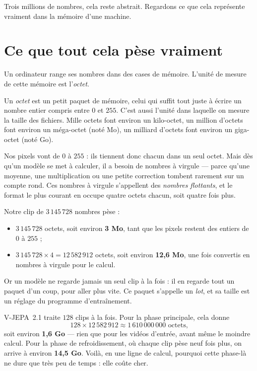Trois millions de nombres, cela reste abstrait. Regardons ce que cela
représente vraiment dans la mémoire d'une machine.

\section{Ce que tout cela pèse vraiment}

Un ordinateur range ses nombres dans des cases de mémoire. L'unité de
mesure de cette mémoire est l'\emph{octet}.

\begin{definition}[L'octet][octet]
Un \emph{octet} est un petit paquet de mémoire, celui qui suffit tout juste
à écrire un nombre entier compris entre $0$ et $255$. C'est aussi l'unité
dans laquelle on mesure la taille des fichiers. Mille octets font environ un
kilo-octet, un million d'octets font environ un méga-octet (noté Mo), un
milliard d'octets font environ un giga-octet (noté Go).
\end{definition}

Nos pixels vont de $0$ à $255$ : ils tiennent donc chacun dans un seul
octet. Mais dès qu'un modèle se met à calculer, il a besoin de nombres à
virgule — parce qu'une moyenne, une multiplication ou une petite correction
tombent rarement sur un compte rond. Ces nombres à virgule s'appellent des
\emph{nombres flottants}, et le format le plus courant en occupe quatre
octets chacun, soit quatre fois plus.

\begin{exemple}
Notre clip de $3\,145\,728$ nombres pèse :

\begin{itemize}
  \item $3\,145\,728$ octets, soit environ \textbf{3 Mo}, tant que les
        pixels restent des entiers de $0$ à $255$ ;
  \item $3\,145\,728 \times 4 = 12\,582\,912$ octets, soit environ
        \textbf{12,6 Mo}, une fois convertis en nombres à virgule pour le
        calcul.
\end{itemize}
\end{exemple}

Or un modèle ne regarde jamais un seul clip à la fois : il en regarde tout
un paquet d'un coup, pour aller plus vite. Ce paquet s'appelle un
\emph{lot}, et sa taille est un réglage du programme d'entraînement.

\begin{exemple}
V-JEPA~2.1 traite $128$ clips à la fois. Pour la phase principale, cela
donne
\[
  128 \times 12\,582\,912 \approx 1\,610\,000\,000 \text{ octets,}
\]
soit environ \textbf{1,6 Go} — rien que pour les vidéos d'entrée, avant
même le moindre calcul. Pour la phase de refroidissement, où chaque clip
pèse neuf fois plus, on arrive à environ \textbf{14,5 Go}. Voilà, en une
ligne de calcul, pourquoi cette phase-là ne dure que très peu de temps :
elle coûte cher.
\end{exemple}

